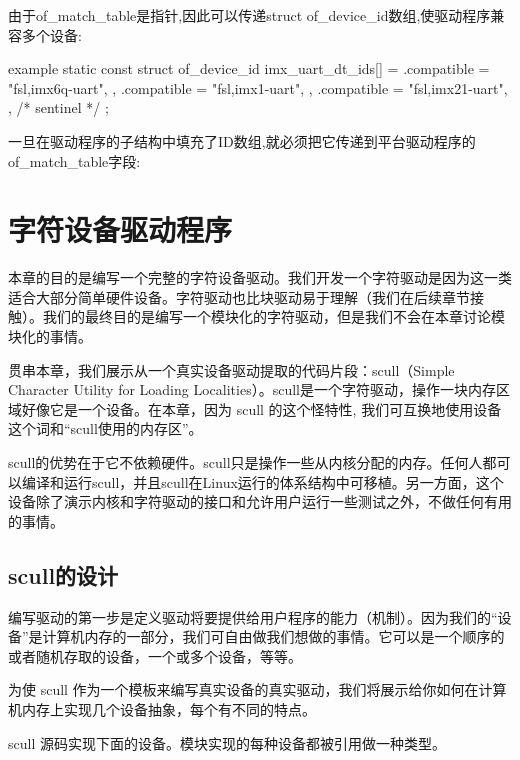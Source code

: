 \documentclass[lang=cn,newtx,10pt,scheme=chinese]{elegantbook}
\begin{document}
由于of\_match\_table是指针,因此可以传递struct of\_device\_id数组,使驱动程序兼容多个设备:

\begin{mycode}{example}
static const struct of_device_id imx_uart_dt_ids[] = {
    { .compatible = "fsl,imx6q-uart", },
    { .compatible = "fsl,imx1-uart", },
    { .compatible = "fsl,imx21-uart", },
    { /* sentinel */ }
};
\end{mycode}

一旦在驱动程序的子结构中填充了ID数组,就必须把它传递到平台驱动程序的of\_match\_table字段:

\chapter{字符设备驱动程序}

本章的目的是编写一个完整的字符设备驱动。我们开发一个字符驱动是因为这一类适合大部分简单硬件设备。字符驱动也比块驱动易于理解（我们在后续章节接触）。我们的最终目的是编写一个模块化的字符驱动，但是我们不会在本章讨论模块化的事情。

贯串本章，我们展示从一个真实设备驱动提取的代码片段：scull（Simple Character Utility for Loading Localities）。scull是一个字符驱动，操作一块内存区域好像它是一个设备。在本章，因为 scull 的这个怪特性, 我们可互换地使用设备这个词和``scull使用的内存区''。

scull的优势在于它不依赖硬件。scull只是操作一些从内核分配的内存。任何人都可以编译和运行scull，并且scull在Linux运行的体系结构中可移植。另一方面，这个设备除了演示内核和字符驱动的接口和允许用户运行一些测试之外，不做任何有用的事情。

\section{scull的设计}

编写驱动的第一步是定义驱动将要提供给用户程序的能力（机制）。因为我们的``设备''是计算机内存的一部分，我们可自由做我们想做的事情。它可以是一个顺序的或者随机存取的设备，一个或多个设备，等等。

为使 scull 作为一个模板来编写真实设备的真实驱动，我们将展示给你如何在计算机内存上实现几个设备抽象，每个有不同的特点。

scull 源码实现下面的设备。模块实现的每种设备都被引用做一种类型。
\end{document}
